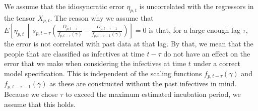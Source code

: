 \documentclass[12pt]{article}
\begin{document}
	We assume that the idiosyncratic error $\eta_{p,t}$ is uncorrelated with the regressors in the tensor $X_{p,t}$. The reason why we assume that $E\left[\eta_{p,t} \,\middle|\, s_{p,t-\tau}\left(\frac{D_{p,t-\tau}}{f_{p,t-\tau}(\gamma)} - \frac{D_{p,t-\tau-1}}{f_{p,t-\tau-1}(\gamma)}\right)\right] = 0$ is that, for a large enough lag $\tau$, the error is not correlated with past data at that lag. By that, we mean that the people that are classified as infectives at time $t-\tau$ do not have an effect on the error that we make when considering the infectives at time $t$ under a correct model specification. This is independent of the scaling functions $f_{p,t-\tau}(\gamma)$ and $f_{p,t-\tau-1}(\gamma)$ as these are constructed without the past infectives in mind. Because we chose $\tau$ to exceed the maximum estimated incubation period, we assume that this holds. \\

	    
	    
	
	
\end{document}
